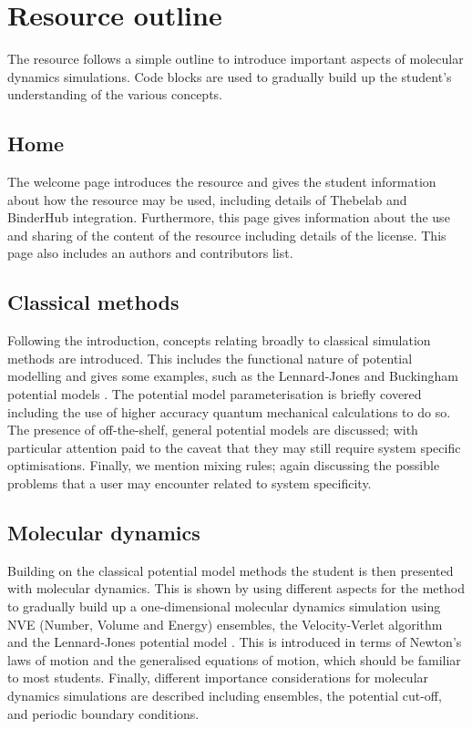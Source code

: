 \documentclass[amsmath,amssymb,twocolumn,superscriptaddress]{revtex4-1}
\begin{document}
\section{Resource outline}

The resource follows a simple outline to introduce important aspects of molecular dynamics simulations.
Code blocks are used to gradually build up the student's understanding of the various concepts.

\subsection{Home}

The welcome page introduces the resource and gives the student information about how the resource may be used, including details of Thebelab and BinderHub integration.
Furthermore, this page gives information about the use and sharing of the content of the resource including details of the license.
This page also includes an authors and contributors list.

\subsection{Classical methods}

Following the introduction, concepts relating broadly to classical simulation methods are introduced.
This includes the functional nature of potential modelling and gives some examples, such as the Lennard-Jones and Buckingham potential models \cite{lennard-jones_determination_1924,buckingham_classical_1938}.
The potential model parameterisation is briefly covered including the use of higher accuracy quantum mechanical calculations to do so.
The presence of off-the-shelf, general potential models are discussed; with particular attention paid to the caveat that they may still require system specific optimisations.
Finally, we mention mixing rules; again discussing the possible problems that a user may encounter related to system specificity.

\subsection{Molecular dynamics}

Building on the classical potential model methods the student is then presented with molecular dynamics.
This is shown by using different aspects for the method to gradually build up a one-dimensional molecular dynamics simulation using NVE (Number, Volume and Energy) ensembles, the Velocity-Verlet algorithm and the Lennard-Jones potential model \cite{swope_computer_1982,lennard-jones_determination_1924}.
This is introduced in terms of Newton's laws of motion and the generalised equations of motion, which should be familiar to most students.
Finally, different importance considerations for molecular dynamics simulations are described including ensembles, the potential cut-off, and periodic boundary conditions.
\end{document}

